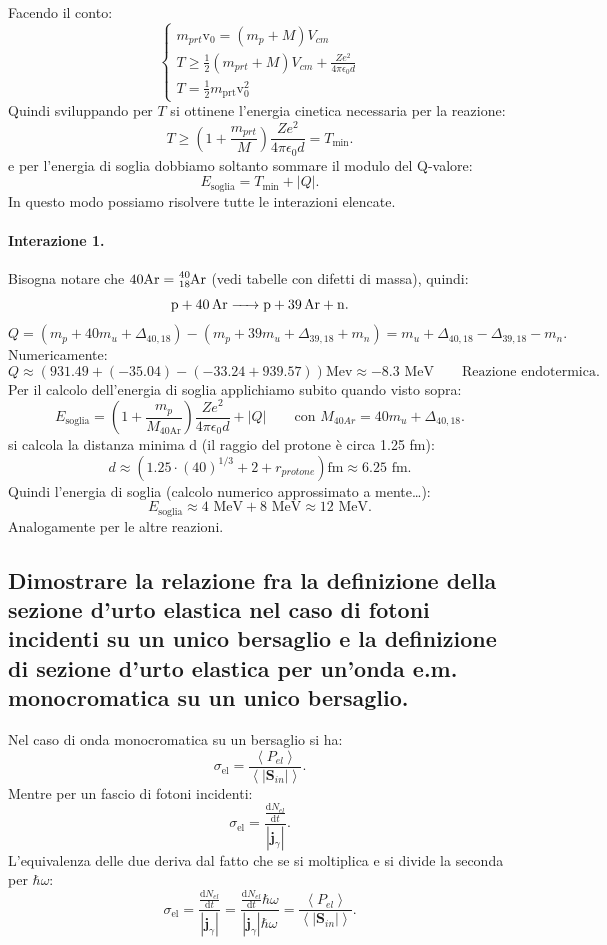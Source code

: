 Facendo il conto:
 \[
\begin{cases}
	m_{prt}\text{v}_0 = \left( m_p + M \right)V_{cm}\\
	T \ge \frac{1}{2}\left( m_{prt} + M \right)V_{cm} + \frac{Ze^2}{4\pi \epsilon_0 d} \\
	T = \frac{1}{2}m_{\text{prt}}\text{v}_0^2
\end{cases}
\]
Quindi sviluppando per $T$ si ottinene l'energia cinetica necessaria per la reazione:
\[
	T \ge \left( 1 + \frac{m_{prt}}{M} \right) \frac{Ze^2}{4\pi \epsilon_0 d} = T_{\text{min}} 
.\] 
e per l'energia di soglia dobbiamo soltanto sommare il modulo del Q-valore:
\[
	E_{\text{soglia}} = T_{\text{min}} + \left| Q \right| 
.\] 
In questo modo possiamo risolvere tutte le interazioni elencate.

\paragraph{Interazione 1.}
Bisogna notare che $40 \text{Ar} = \ce{^{40}_{18}\text{Ar}}$ (vedi tabelle con difetti di massa), quindi:
\[
	\ce{p + 40\text{Ar} -> p + 39\text{Ar} + n}
.\] 
\[
	Q = \left( m_p + 40m_u + \Delta_{40, 18} \right) - \left( m_p + 39 m_u + \Delta_{39, 18} + m_n  \right) = m_u + \Delta_{40, 18} - \Delta_{39, 18} - m_n      
.\]
Numericamente:
\[
	Q \approx \left( 931.49 + \left( -35.04 \right) - \left( -33.24 + 939.57 \right)  \right)\text{Mev} \approx -8.3 \text{ MeV} \quad \quad \text{Reazione endotermica}
.\]
Per il calcolo dell'energia di soglia applichiamo subito quando visto sopra:
\[
	E_{\text{soglia}} = \left( 1 + \frac{m_p}{M_{40\text{Ar}}} \right) \frac{Ze^2}{4 \pi \epsilon_0 d} + \left| Q \right| \quad \quad 
	\text{con } M_{40Ar} = 40m_u + \Delta_{40,18}
.\]
si calcola la distanza minima d (il raggio del protone è circa 1.25 fm): 
\[
	d \approx \left( 1.25 \cdot \left( 40 \right)^{ 1/3 } + 2 + r_{protone} \right)\text{fm} \approx 6.25 \text{ fm} 
.\] 
Quindi l'energia di soglia (calcolo numerico approssimato a mente\ldots):
\[
	E_{\text{soglia}} \approx 4 \text{ MeV} + 8 \text{ MeV} \approx 12 \text{ MeV}   
.\] 
Analogamente per le altre reazioni.

\subsection[]{  Dimostrare la relazione fra la definizione della sezione d’urto elastica nel caso di fotoni incidenti su un unico bersaglio e la definizione di sezione d'urto elastica per un’onda e.m. monocromatica su un unico bersaglio.}
Nel caso di onda monocromatica su un bersaglio si ha:
\[
	\sigma_{\text{el}} = \frac{\left< P_{el}\right>}{\left<\left| \boldsymbol{S}_{in} \right|  \right>}
.\]
Mentre per un fascio di fotoni incidenti:
\[
	\sigma_{\text{el}} = \frac{\frac{\mbox{d} N_{el}}{\mbox{d} t}}{\left| \boldsymbol{j}_{\gamma}\right|}
.\] 
L'equivalenza delle due deriva dal fatto che se si moltiplica e si divide la seconda per $ \hbar \omega$:
\[
	\sigma_{\text{el}} = \frac{\frac{\mbox{d} N_{el}}{\mbox{d} t}}{\left| \boldsymbol{j}_{\gamma}\right|} = \frac{\frac{\mbox{d} N_{el}}{\mbox{d} t}\hbar \omega }{\left| \boldsymbol{j}_{\gamma}\right|\hbar \omega} = \frac{\left< P_{el}\right>}{\left<\left| \boldsymbol{S}_{in} \right|  \right>}
.\] 	

